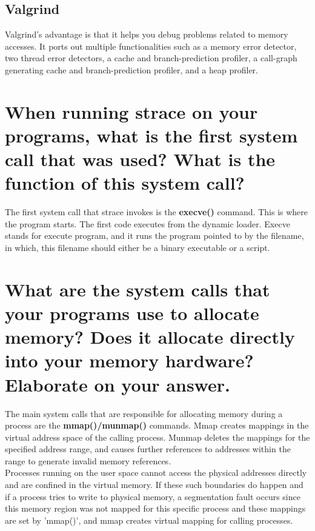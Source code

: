 \documentclass[conference]{IEEEtran}
\newcommand\tab[1][0.5cm]{\hspace*{#1}}
\begin{document}
\subsection{Valgrind}
Valgrind's advantage is that it helps you debug problems related to memory accesses. It ports out multiple functionalities such as a memory error detector, two thread error detectors, a cache and branch-prediction profiler, a call-graph generating cache and branch-prediction profiler, and a heap profiler. 

\section{When running strace on your programs, what is the first system call that was
used? What is the function of this system call?}
The first system call that strace invokes is the \textbf{execve()} command. This is where the program starts. The first code executes from the dynamic loader. Execve stands for execute program, and it runs the program pointed to by the filename, in which, this filename should either be a binary executable or a script.

\section{What are the system calls that your programs use to allocate memory? Does it
allocate directly into your memory hardware? Elaborate on your answer.}
The main system calls that are responsible for allocating memory during a process are the \textbf{mmap()/munmap()} commands. Mmap creates mappings in the virtual address space of the calling process. Munmap deletes the mappings for the specified address range, and causes further references to addresses within the range to generate invalid memory references. \\
\tab Processes running on the user space cannot access the physical addresses directly and are confined in the virtual memory. If these such boundaries do happen and if a process tries to write to physical memory, a segmentation fault occurs since this memory region was not mapped for this specific process and these mappings are set by 'mmap()', and mmap creates virtual mapping for calling processes.
\end{document}
